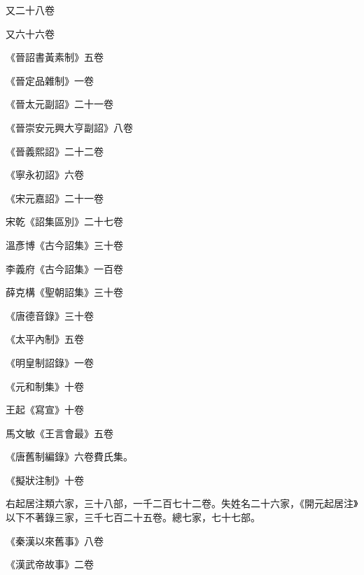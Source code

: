 \begin{pinyinscope}
 又二十八卷



 又六十六卷



 《晉詔書黃素制》五卷



 《晉定品雜制》一卷



 《晉太元副詔》二十一卷



 《晉崇安元興大亨副詔》八卷



 《晉義熙詔》二十二卷



 《寧永初詔》六卷



 《宋元嘉詔》二十一卷



 宋乾《詔集區別》二十七卷



 溫彥博《古今詔集》三十卷



 李義府《古今詔集》一百卷



 薛克構《聖朝詔集》三十卷



 《唐德音錄》三十卷



 《太平內制》五卷



 《明皇制詔錄》一卷



 《元和制集》十卷



 王起《寫宣》十卷



 馬文敏《王言會最》五卷



 《唐舊制編錄》六卷費氏集。



 《擬狀注制》十卷



 右起居注類六家，三十八部，一千二百七十二卷。失姓名二十六家，《開元起居注》以下不著錄三家，三千七百二十五卷。總七家，七十七部。



 《秦漢以來舊事》八卷



 《漢武帝故事》二卷




\end{pinyinscope}
